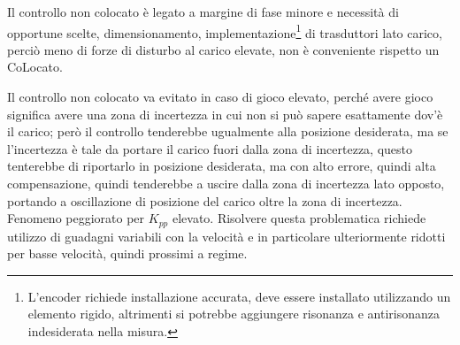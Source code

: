 Il controllo non colocato è legato a margine di fase minore e necessità di opportune scelte, dimensionamento, implementazione\footnote{L'encoder richiede installazione accurata, deve essere installato utilizzando un elemento rigido, altrimenti si potrebbe aggiungere risonanza e antirisonanza indesiderata nella misura.} di trasduttori lato carico, perciò meno di forze di disturbo al carico elevate, non è conveniente rispetto un CoLocato.

Il controllo non colocato va evitato in caso di gioco elevato, perché avere gioco significa avere una zona di incertezza in cui non si può sapere esattamente dov'è il carico; però il controllo tenderebbe ugualmente alla posizione desiderata, ma se l'incertezza è tale da portare il carico fuori dalla zona di incertezza, questo tenterebbe di riportarlo in posizione desiderata, ma con alto errore, quindi alta compensazione, quindi tenderebbe a uscire dalla zona di incertezza lato opposto, portando a oscillazione di posizione del carico oltre la zona di incertezza. Fenomeno peggiorato per \(K_{pp}\) elevato.
Risolvere questa problematica richiede utilizzo di guadagni variabili con la velocità e in particolare ulteriormente ridotti per basse velocità, quindi prossimi a regime.